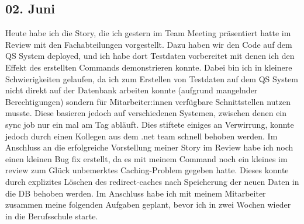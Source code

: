 \subsection{02. Juni}
Heute habe ich die Story, die ich gestern im Team Meeting präsentiert hatte im Review mit den Fachabteilungen vorgestellt. Dazu haben wir den Code auf dem QS System deployed, und ich habe dort Testdaten vorbereitet mit denen ich den Effekt des erstellten Commands demonstrieren konnte. Dabei bin ich in kleinere Schwierigkeiten gelaufen, da ich zum Erstellen von Testdaten auf dem QS System nicht direkt auf der Datenbank arbeiten konnte (aufgrund mangelnder Berechtigungen) sondern für Mitarbeiter:innen verfügbare Schnittstellen nutzen musste. Diese basieren jedoch auf verschiedenen Systemen, zwischen denen ein sync job nur ein mal am Tag abläuft. Dies stiftete einiges an Verwirrung, konnte jedoch durch einen Kollegen aus dem .net team schnell behoben werden. 
Im Anschluss an die erfolgreiche Vorstellung meiner Story im Review habe ich noch einen kleinen Bug fix erstellt, da es mit meinem Command noch ein kleines im review zum Glück unbemerktes Caching-Problem gegeben hatte. Dieses konnte durch explizites Löschen des redirect-caches nach Speicherung der neuen Daten in die DB behoben werden.
Im Anschluss habe ich mit meinem Mitarbeiter zusammen meine folgenden Aufgaben geplant, bevor ich in zwei Wochen wieder in die Berufsschule starte.